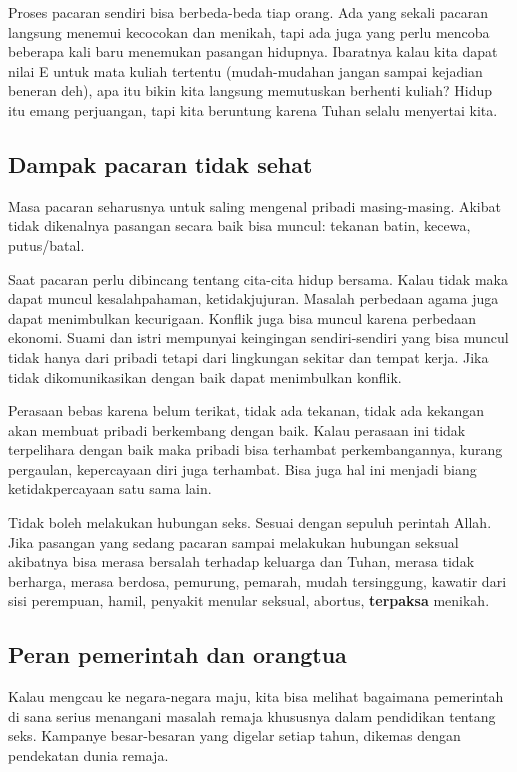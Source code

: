 \documentclass[11pt]{scrartcl}
\begin{document}
Proses pacaran sendiri bisa berbeda-beda tiap orang. Ada yang sekali pacaran langsung menemui kecocokan dan menikah, tapi ada juga yang perlu mencoba beberapa kali baru menemukan pasangan hidupnya. Ibaratnya kalau kita dapat nilai E untuk mata kuliah tertentu (mudah-mudahan jangan sampai kejadian beneran deh), apa itu bikin kita langsung memutuskan berhenti kuliah? Hidup itu emang perjuangan, tapi kita beruntung karena Tuhan selalu menyertai kita.


\subsection*{Dampak pacaran tidak sehat}

Masa pacaran seharusnya untuk saling mengenal pribadi masing-masing. Akibat tidak dikenalnya pasangan secara baik bisa muncul:
tekanan batin, kecewa, putus/batal.

Saat pacaran perlu dibincang tentang cita-cita hidup bersama. Kalau tidak maka dapat muncul kesalahpahaman, ketidakjujuran. Masalah perbedaan agama juga dapat menimbulkan kecurigaan. Konflik juga bisa muncul karena perbedaan ekonomi. Suami dan istri mempunyai keingingan sendiri-sendiri yang bisa muncul tidak hanya dari pribadi tetapi dari lingkungan sekitar dan tempat kerja. Jika tidak dikomunikasikan dengan baik dapat menimbulkan konflik. \cite{iman1996}


Perasaan bebas karena belum terikat, tidak ada tekanan, tidak ada kekangan akan membuat pribadi berkembang dengan baik. Kalau perasaan ini
tidak terpelihara dengan baik maka
pribadi bisa terhambat perkembangannya, 
kurang pergaulan, kepercayaan diri juga terhambat. 
Bisa juga hal ini menjadi biang ketidakpercayaan satu sama lain.

Tidak boleh melakukan hubungan seks. Sesuai dengan sepuluh perintah Allah. Jika pasangan yang sedang pacaran sampai melakukan hubungan seksual akibatnya bisa
merasa bersalah terhadap keluarga dan Tuhan,
merasa tidak berharga,
merasa berdosa,
pemurung, pemarah, mudah tersinggung,
kawatir dari sisi perempuan,
hamil,
penyakit menular seksual, abortus,
\textbf{terpaksa} menikah.

\subsection*{Peran pemerintah dan orangtua}
Kalau mengcau ke negara-negara maju, kita bisa melihat bagaimana pemerintah di sana serius menangani masalah remaja khususnya dalam pendidikan tentang seks. Kampanye besar-besaran yang digelar setiap tahun, dikemas dengan pendekatan dunia remaja.
\end{document}
